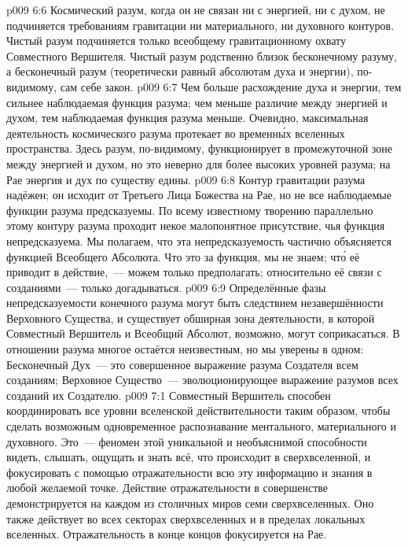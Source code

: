 \vs p009 6:6 \pc Космический разум, когда он не связан ни с энергией, ни с духом, не подчиняется требованиям гравитации ни материального, ни духовного контуров. Чистый разум подчиняется только всеобщему гравитационному охвату Совместного Вершителя. Чистый разум родственно близок бесконечному разуму, а бесконечный разум (теоретически равный абсолютам духа и энергии), по\hyp{}видимому, сам себе закон.
\vs p009 6:7 Чем больше расхождение духа и энергии, тем сильнее наблюдаемая функция разума; чем меньше различие между энергией и духом, тем наблюдаемая функция разума меньше. Очевидно, максимальная деятельность космического разума протекает во временн\'ых вселенных пространства. Здесь разум, по\hyp{}видимому, функционирует в промежуточной зоне между энергией и духом, но это неверно для более высоких уровней разума; на Рае энергия и дух по существу едины.
\vs p009 6:8 \pc Контур гравитации разума надёжен; он исходит от Третьего Лица Божества на Рае, но не все наблюдаемые функции разума предсказуемы. По всему известному творению параллельно этому контуру разума проходит некое малопонятное присутствие, чья функция непредсказуема. Мы полагаем, что эта непредсказуемость частично объясняется функцией Всеобщего Абсолюта. Что это за функция, мы не знаем; чт\'о её приводит в действие,~--- можем только предполагать; относительно её связи с созданиями~--- только догадываться.
\vs p009 6:9 \pc Определённые фазы непредсказуемости конечного разума могут быть следствием незавершённости Верховного Существа, и существует обширная зона деятельности, в которой Совместный Вершитель и Всеобщий Абсолют, возможно, могут соприкасаться. В отношении разума многое остаётся неизвестным, но мы уверены в одном: Бесконечный Дух~--- это совершенное выражение разума Создателя всем созданиям; Верховное Существо~--- эволюционирующее выражение разумов всех созданий их Создателю.
\vs p009 7:1 Совместный Вершитель способен координировать все уровни вселенской действительности таким образом, чтобы сделать возможным одновременное распознавание ментального, материального и духовного. Это~--- феномен  этой уникальной и необъяснимой способности видеть, слышать, ощущать и знать всё, что происходит в сверхвселенной, и фокусировать с помощью отражательности всю эту информацию и знания в любой желаемой точке. Действие отражательности в совершенстве демонстрируется на каждом из столичных миров семи сверхвселенных. Оно также действует во всех секторах сверхвселенных и в пределах локальных вселенных. Отражательность в конце концов фокусируется на Рае.
